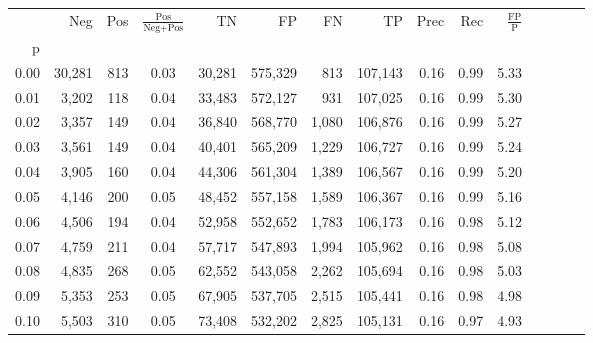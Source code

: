 \begin{tabular}{rrrcrrrrrrrrrrr}
\toprule
{} &     Neg &    Pos & $\frac{\text{Pos}}{\text{Neg}+\text{Pos}}$ &       TN &       FP &       FN &       TP &  Prec &   Rec & $\frac{\text{FP}}{\text{P}}$ \\
p    &         &        &                                            &          &          &          &          &       &       &                              \\
\midrule
0.00 &  30,281 &    813 &                                       0.03 &   30,281 &  575,329 &      813 &  107,143 &  0.16 &  0.99 &                         5.33 \\
0.01 &   3,202 &    118 &                                       0.04 &   33,483 &  572,127 &      931 &  107,025 &  0.16 &  0.99 &                         5.30 \\
0.02 &   3,357 &    149 &                                       0.04 &   36,840 &  568,770 &    1,080 &  106,876 &  0.16 &  0.99 &                         5.27 \\
0.03 &   3,561 &    149 &                                       0.04 &   40,401 &  565,209 &    1,229 &  106,727 &  0.16 &  0.99 &                         5.24 \\
0.04 &   3,905 &    160 &                                       0.04 &   44,306 &  561,304 &    1,389 &  106,567 &  0.16 &  0.99 &                         5.20 \\
0.05 &   4,146 &    200 &                                       0.05 &   48,452 &  557,158 &    1,589 &  106,367 &  0.16 &  0.99 &                         5.16 \\
0.06 &   4,506 &    194 &                                       0.04 &   52,958 &  552,652 &    1,783 &  106,173 &  0.16 &  0.98 &                         5.12 \\
0.07 &   4,759 &    211 &                                       0.04 &   57,717 &  547,893 &    1,994 &  105,962 &  0.16 &  0.98 &                         5.08 \\
0.08 &   4,835 &    268 &                                       0.05 &   62,552 &  543,058 &    2,262 &  105,694 &  0.16 &  0.98 &                         5.03 \\
0.09 &   5,353 &    253 &                                       0.05 &   67,905 &  537,705 &    2,515 &  105,441 &  0.16 &  0.98 &                         4.98 \\
0.10 &   5,503 &    310 &                                       0.05 &   73,408 &  532,202 &    2,825 &  105,131 &  0.16 &  0.97 &                         4.93 \\

\end{tabular}
